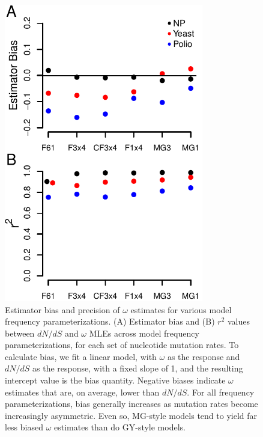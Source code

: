 \documentclass[11pt]{article}
\begin{document}
\begin{figure}[htbp]
	\centerline{\includegraphics[width=8.7cm]{figures/MainText/nyp_bias_r2.pdf}}
	\caption{\label{nyp_bias_r2} Estimator bias and precision of $\omega$ estimates for various model frequency parameterizations. (A) Estimator bias and (B) $r^2$ values between $dN/dS$ and $\omega$ MLEs across model frequency parameterizations, for each set of nucleotide mutation rates. To calculate bias, we fit a linear model, with $\omega$ as the response and $dN/dS$ as the response, with a fixed slope of 1, and the resulting intercept value is the bias quantity. Negative biases indicate $\omega$ estimates that are, on average, lower than $dN/dS$. For all frequency parameterizations, bias generally increases as mutation rates become increasingly asymmetric. Even so, MG-style models tend to yield far less biased $\omega$ estimates than do GY-style models.}	
\end{figure}

\vspace{2cm}
\end{document}
